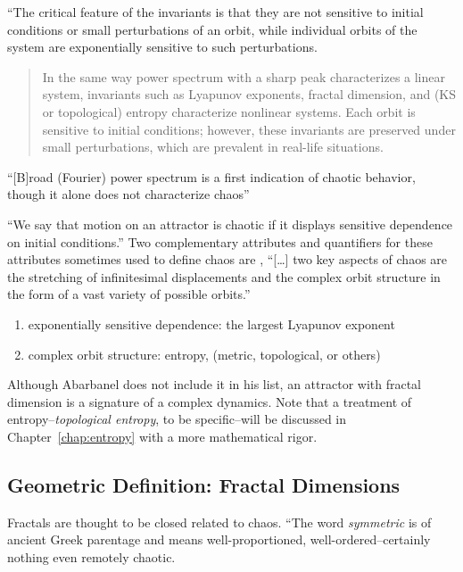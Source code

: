 \documentclass[12pt,twoside,draft]{book}
\begin{document}
``The critical feature of the invariants is that they are not sensitive to initial conditions
or small perturbations of an orbit, while individual orbits of the system are exponentially
sensitive to such perturbations. \citep[p.1334]{abarbanel}
\begin{quote}
  In the same way power spectrum with a sharp peak characterizes a linear system, invariants such as Lyapunov exponents, fractal dimension, and (KS or topological) entropy characterize nonlinear systems.
  Each orbit is sensitive to initial conditions; however, these invariants are preserved under small perturbations, which are prevalent in real-life situations.
\end{quote}

``[B]road (Fourier) power spectrum is a first indication of chaotic behavior, though it alone does not characterize chaos''\citep[p.1338]{abarbanel}

``We say that motion on an attractor is chaotic if it displays sensitive dependence on initial conditions.'' \citep[p.11]{ott1994}
Two complementary attributes and quantifiers for these attributes sometimes used to define chaos are \citep[p.379]{abarbanel}, %
``[\ldots] two key aspects of chaos are the stretching of infinitesimal displacements and the complex orbit structure in the form of a vast variety of possible orbits.'' \citep[p.31]{ott1994}
\begin{enumerate}
  \item exponentially sensitive dependence: the largest Lyapunov exponent 
  \item complex orbit structure: entropy, (metric, topological, or others)
\end{enumerate}

Although Abarbanel does not include it in his list, an attractor with fractal dimension is a signature of a complex dynamics.
Note that a treatment of entropy--\textit{topological entropy}, to be specific--will be discussed in Chapter~\ref{chap:entropy} with a more mathematical rigor.

\subsection*{Geometric Definition: Fractal Dimensions}
Fractals are thought to be closed related to chaos.
\citet{schroeder} 
``The word \textit{symmetric} is of ancient Greek parentage and means well-proportioned, well-ordered--certainly nothing even remotely chaotic.
\end{document}
